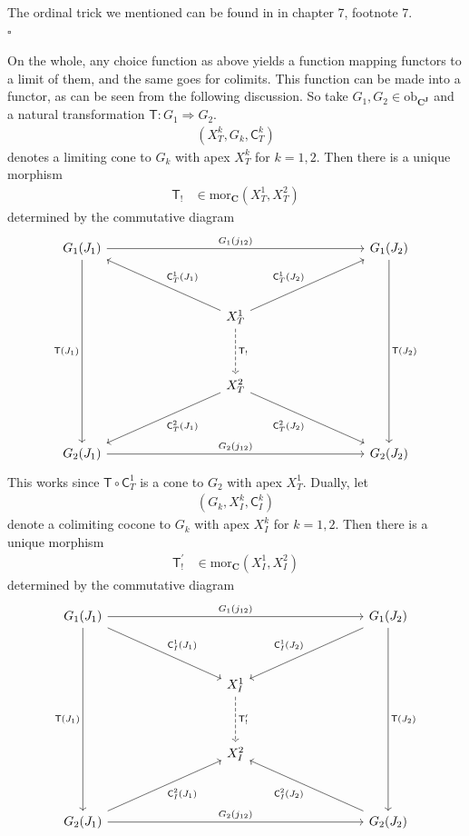 \begin{prf}
The ordinal trick we mentioned can be found in \cite{53fd7d7e} in chapter 7, footnote 7.
\\
\phantom{proven}
\hfill
$\square$
\end{prf}
On the whole, any choice function as above yields a function mapping functors to a limit of them, and the same goes for colimits.
This function can be made into a functor, as can be seen from the following discussion.
So take $G_{1},G_{2} \in \mathrm{ob}_{\mathbf{C}^{\mathbf{J}}}$ and a natural transformation $\mathsf{T} \colon G_{1} \Rightarrow G_{2}$.
\begin{align*}
  \left(
    X_{T}^{k},
    G_{k},
    \mathsf{C}_{T}^{k}
  \right)
\end{align*}
denotes a limiting cone to $G_{k}$ with apex $X_{T}^{k}$ for $k = 1,2$.
Then there is a unique morphism
\begin{align*}
  \mathsf{T}_{!}
  &\in
  \mathrm{mor}_{\mathbf{C}}
  \left(
    X_{T}^{1},
    X_{T}^{2}
  \right)
\end{align*}
determined by the commutative diagram
\[
\begin{tikzcd}[row sep=huge, column sep=9em]
  G_{1}(J_{1})
  \arrow{rr}{G_{1}(j_{12})}
  \arrow[swap]{ddd}{\mathsf{T}(J_{1})}
  &
  &
  G_{1}(J_{2})
  \arrow{ddd}{\mathsf{T}(J_{2})}
  \\
  &
  X_{T}^{1}
  \arrow{ur}{\mathsf{C}_{T}^{1}(J_{2})}
  \arrow[dashed]{d}{\mathsf{T}_{!}}
  \arrow[swap]{ul}{\mathsf{C}_{T}^{1}(J_{1})}
  &
  \\
  &
  X_{T}^{2}
  \arrow[swap]{dr}{\mathsf{C}_{T}^{2}(J_{2})}
  \arrow{dl}{\mathsf{C}_{T}^{2}(J_{1})}
  &
  \\
  G_{2}(J_{1})
  \arrow{rr}{G_{2}(j_{12})}
  &
  &
  G_{2}(J_{2})
\end{tikzcd}
\]
This works since $\mathsf{T} \circ \mathsf{C}_{T}^{1}$ is a cone to $G_{2}$ with apex $X_{T}^{1}$.
Dually, let
\begin{align*}
  \left(
    G_{k},
    X_{I}^{k},
    \mathsf{C}_{I}^{k}
  \right)
\end{align*}
denote a colimiting cocone to $G_{k}$ with apex $X_{I}^{k}$ for $k = 1,2$.
Then there is a unique morphism
\begin{align*}
  \mathsf{T}_{!}^{\prime}
  &\in
  \mathrm{mor}_{\mathbf{C}}
  \left(
    X_{I}^{1},
    X_{I}^{2}
  \right)
\end{align*}
determined by the commutative diagram
\[
\begin{tikzcd}[row sep=huge, column sep=9em]
  G_{1}(J_{1})
  \arrow{rr}{G_{1}(j_{12})}
  \arrow[swap]{ddd}{\mathsf{T}(J_{1})}
  \arrow{dr}{\mathsf{C}_{I}^{1}(J_{1})}
  &
  &
  G_{1}(J_{2})
  \arrow[swap]{dl}{\mathsf{C}_{I}^{1}(J_{2})}
  \arrow{ddd}{\mathsf{T}(J_{2})}
  \\
  &
  X_{I}^{1}
  \arrow[dashed]{d}{\mathsf{T}_{!}^{\prime}}
  &
  \\
  &
  X_{I}^{2}
  &
  \\
  G_{2}(J_{1})
  \arrow[swap]{ur}{\mathsf{C}_{I}^{2}(J_{1})}
  \arrow{rr}{G_{2}(j_{12})}
  &
  &
  G_{2}(J_{2})
  \arrow{ul}{\mathsf{C}_{I}^{2}(J_{2})}
\end{tikzcd}
\]

